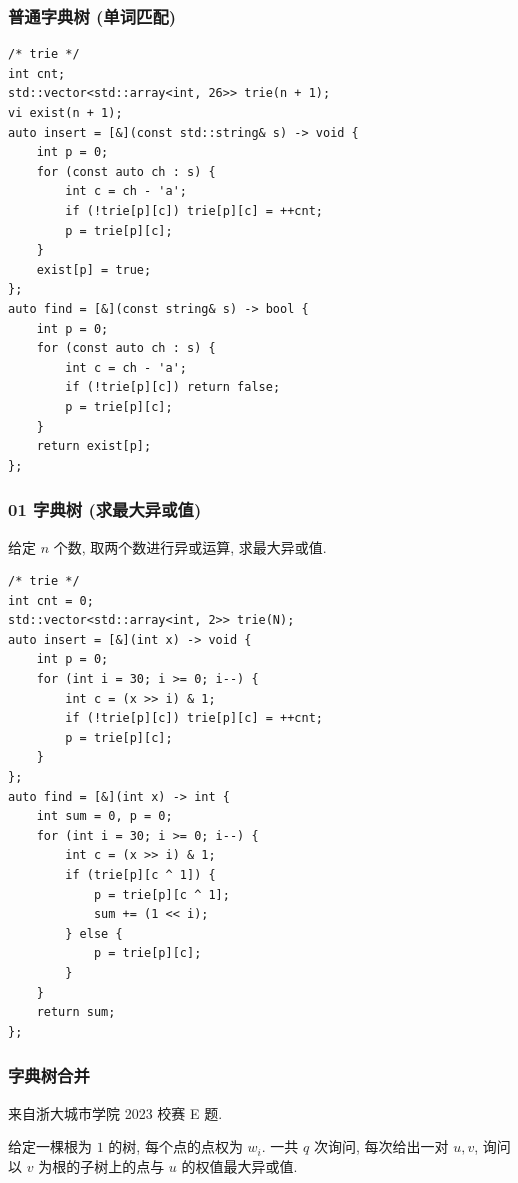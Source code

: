 \documentclass[UTF8, a4paper, titlepage, twoside]{ctexart}
\begin{document}
\subsubsection*{ 普通字典树 (单词匹配) }
\begin{lstlisting}[style=cpp]
/* trie */
int cnt;
std::vector<std::array<int, 26>> trie(n + 1);
vi exist(n + 1);
auto insert = [&](const std::string& s) -> void {
    int p = 0;
    for (const auto ch : s) {
        int c = ch - 'a';
        if (!trie[p][c]) trie[p][c] = ++cnt;
        p = trie[p][c];
    }
    exist[p] = true;
};
auto find = [&](const string& s) -> bool {
    int p = 0;
    for (const auto ch : s) {
        int c = ch - 'a';
        if (!trie[p][c]) return false;
        p = trie[p][c];
    }
    return exist[p];
};
\end{lstlisting}

\subsubsection*{ 01 字典树 (求最大异或值) }

给定 $n$ 个数, 取两个数进行异或运算, 求最大异或值.

\begin{lstlisting}[style=cpp]
/* trie */
int cnt = 0;
std::vector<std::array<int, 2>> trie(N);
auto insert = [&](int x) -> void {
    int p = 0;
    for (int i = 30; i >= 0; i--) {
        int c = (x >> i) & 1;
        if (!trie[p][c]) trie[p][c] = ++cnt;
        p = trie[p][c];
    }
};
auto find = [&](int x) -> int {
    int sum = 0, p = 0;
    for (int i = 30; i >= 0; i--) {
        int c = (x >> i) & 1;
        if (trie[p][c ^ 1]) {
            p = trie[p][c ^ 1];
            sum += (1 << i);
        } else {
            p = trie[p][c];
        }
    }
    return sum;
};
\end{lstlisting}

\subsubsection*{ 字典树合并 }

来自浙大城市学院 2023 校赛 E 题.

给定一棵根为 $1$ 的树, 每个点的点权为 $w_i$.
一共 $q$ 次询问, 每次给出一对 $u, v$, 询问以 $v$ 为根的子树上的点与 $u$ 的权值最大异或值.
\end{document}

